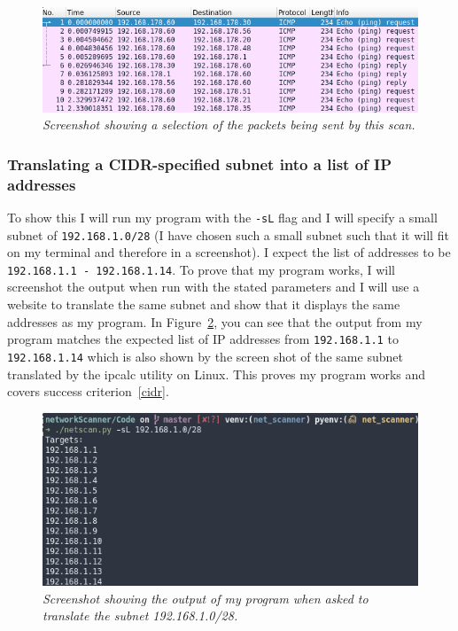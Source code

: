 \documentclass[titlepage]{article}
\let\Oldsubsubsection\subsubsection{}
\renewcommand{\subsubsection}{\FloatBarrier\Oldsubsubsection}
\begin{document}
\begin{figure}[H]
  \centering
  \includegraphics[width=\textwidth]{pingscantest_Wireshark.png}
  \caption{\textit{%
    Screenshot showing a selection of the packets being sent by this scan.
}}\label{lanscanWireshark}
\end{figure}

\subsubsection{Translating a CIDR-specified subnet into a list of IP addresses}\label{test:cidr}
To show this I will run my program with the \verb|-sL| flag and I will specify
a small subnet of \verb|192.168.1.0/28| (I have chosen such a small subnet
such that it will fit on my terminal and therefore in a screenshot).
I expect the list of addresses to be \verb|192.168.1.1 - 192.168.1.14|.
To prove that my program works,
I will screenshot the output when run with the stated parameters and I will use
a website to translate the same subnet and show
that it displays the same addresses as my program.
In Figure~\ref{cidrtest}, you can see that the output from my program matches
the expected list of IP addresses from \verb|192.168.1.1| to \verb|192.168.1.14|
which is also shown by the screen shot of the same subnet translated by
the ipcalc utility on Linux.
This proves my program works and covers success criterion~\ref{cidr}.

\begin{figure}[H]
  \centering
  \includegraphics[width=\textwidth]{iplist.png}
  \caption{\textit{%
    Screenshot showing the output of my program when asked to translate the subnet 192.168.1.0/28.
}}\label{cidrtest}
\end{figure}
\end{document}
